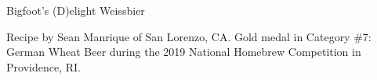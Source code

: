 \begin{recipe}{Bigfoot's (D)elight Weissbier}

\begin{aboutblock}
Recipe by Sean Manrique of San Lorenzo, CA. Gold medal in Category \#7: German
Wheat Beer during the 2019 National Homebrew Competition in Providence, RI.
\sourceaha
\end{aboutblock}


\begin{methodandtiming}
 
\begin{mashsteps}
\end{mashsteps}

\begin{fermentationsteps}
\end{fermentationsteps}

\end{methodandtiming}

\recipebreak

\begin{ingredientsblock}

\begin{malts}
\end{malts}

\begin{hops}
\end{hops}


\end{ingredientsblock}

\end{recipe}

